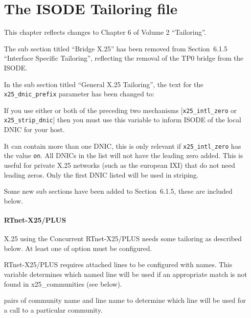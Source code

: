 \chapter{The ISODE Tailoring file}

This chapter reflects changes to Chapter 6 of Volume 2 ``Tailoring''.

The sub section titled ``Bridge X.25'' has been removed from
Section~6.1.5 ``Interface Specific Tailoring'', reflecting the removal of the
TP0 bridge from the ISODE.  

In the sub section titled ``General X.25 Tailoring'', the text for the
\verb+x25_dnic_prefix+ parameter has been changed to:

\begin{describe}
\item[\verb"x25\_dnic\_prefix"] If you use either or both of the
preceding two mechanisms 
[\verb+x25_intl_zero+ or \verb+x25_strip_dnic+]
then you must use this variable to
inform ISODE of the local DNIC for your host.

It can contain more than one DNIC, this is only relevant if 
\verb+x25_intl_zero+ has the value \verb"on".  
All DNICs in the list will not
have the leading zero added.  This is useful for private X.25
networks (such as the european IXI) that do not need leading zeros.
Only the first DNIC listed will be used in striping.
\end{describe}

Some new sub sections have been added to Section~6.1.5, these are
included below.

\subsubsection{RTnet-X25/PLUS}

X.25 using the Concurrent RTnet-X25/PLUS needs some tailoring as
described below.  
At least one of option must be configured.
  
\begin{describe}
\item[\verb"x25\_default\_line"] RTnet-X25/PLUS requires attached lines to be
            configured with names.  This variable determines which named
            line will be used if an appropriate match is not found in
            x25\_communities (see below).

\item[\verb"x25\_communities"] pairs of community name and line name to 
	    determine which line will be used for a call to a 
	    particular community. 
\end{describe}


